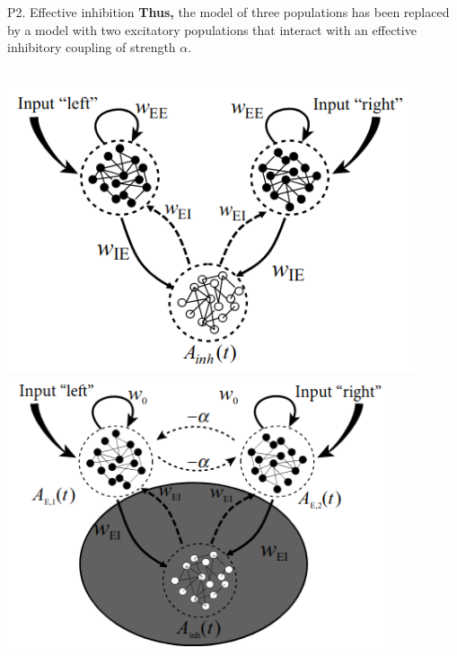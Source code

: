 \documentclass[xcolor=table,dvipsnames,svgnames,aspectratio=169,fontset=fandol]{ctexbeamer}
\begin{document}
\begin{frame}{P2. Effective inhibition}
  \textbf{Thus,} the model of three populations has been replaced by a model with two excitatory populations that interact with an effective inhibitory coupling of strength $\alpha$.

  \vskip 5pt
  \begin{columns}
    \includegraphics[width=0.9\textwidth,height=0.6\textheight]{competition.png}
    \includegraphics[width=0.85\textwidth,height=0.6\textheight]{competition3.png}
  \end{columns}
\end{frame}
\end{document}
